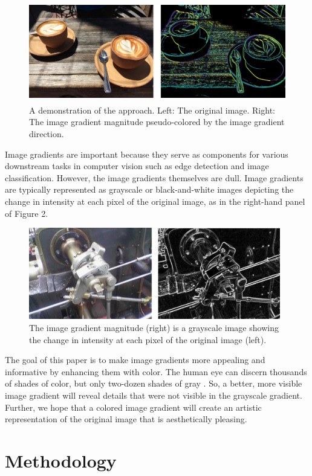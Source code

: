 \documentclass[runningheads]{llncs}
\begin{document}
\begin{figure}
\centering
\includegraphics[height=4.4cm]{images/intro.png}
\caption{A demonstration of the approach. Left: The original image. Right: The image gradient magnitude pseudo-colored by the image gradient direction.}
\label{fig:example}
\end{figure}

Image gradients are important because they serve as components for various downstream tasks in computer vision such as edge detection and image classification. However, the image gradients themselves are dull. Image gradients are typically represented as grayscale or black-and-white images depicting the change in intensity at each pixel of the original image, as in the right-hand panel of Figure 2.

\begin{figure}
\centering
\includegraphics[height=4cm]{images/image_gradient.png}
\caption{The image gradient magnitude (right) is a grayscale image showing the change in intensity at each pixel of the original image (left).}
\label{fig:example}
\end{figure}

The goal of this paper is to make image gradients more appealing and informative by enhancing them with color. The human eye can discern thousands of shades of color, but only two-dozen shades of gray \cite{human_machine}. So, a better, more visible image gradient will reveal details that were not visible in the grayscale gradient. Further, we hope that a colored image gradient will create an artistic representation of the original image that is aesthetically pleasing.

\section{Methodology}
\end{document}
